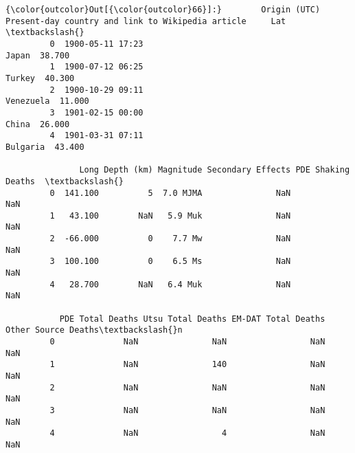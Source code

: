 \documentclass[11pt]{article}
\begin{document}
\begin{Verbatim}[commandchars=\\\{\}]
{\color{outcolor}Out[{\color{outcolor}66}]:}        Origin (UTC) Present-day country and link to Wikipedia article     Lat  \textbackslash{}
         0  1900-05-11 17:23                                             Japan  38.700   
         1  1900-07-12 06:25                                            Turkey  40.300   
         2  1900-10-29 09:11                                         Venezuela  11.000   
         3  1901-02-15 00:00                                             China  26.000   
         4  1901-03-31 07:11                                          Bulgaria  43.400   
         
               Long Depth (km) Magnitude Secondary Effects PDE Shaking Deaths  \textbackslash{}
         0  141.100          5  7.0 MJMA               NaN                NaN   
         1   43.100        NaN   5.9 Muk               NaN                NaN   
         2  -66.000          0    7.7 Mw               NaN                NaN   
         3  100.100          0    6.5 Ms               NaN                NaN   
         4   28.700        NaN   6.4 Muk               NaN                NaN   
         
           PDE Total Deaths Utsu Total Deaths EM-DAT Total Deaths Other Source Deaths\textbackslash{}n  
         0              NaN               NaN                 NaN                   NaN  
         1              NaN               140                 NaN                   NaN  
         2              NaN               NaN                 NaN                   NaN  
         3              NaN               NaN                 NaN                   NaN  
         4              NaN                 4                 NaN                   NaN  
\end{Verbatim}
            
\end{document}
